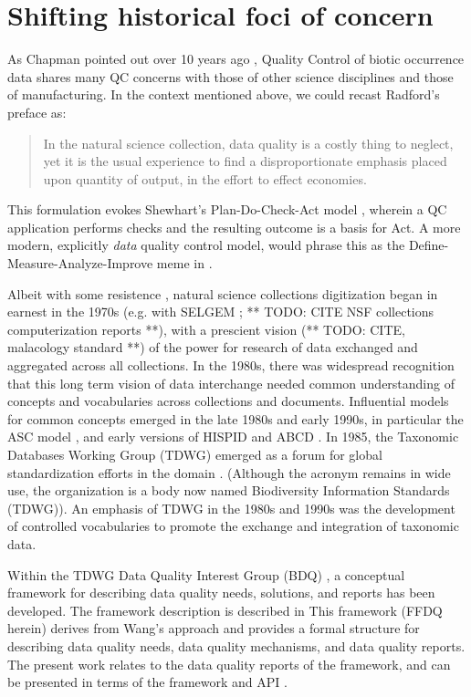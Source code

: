 \documentclass{article}
\begin{document}
  \section{Shifting historical foci of concern}
As Chapman pointed out over 10 years ago \citep{chapman_principles_2005}, Quality Control of biotic occurrence data shares many QC concerns with those of other science disciplines and those of manufacturing. 
In the context mentioned above, we could recast Radford's preface as:
\begin{quotation}
  In the natural science collection, data quality is a costly thing to neglect, yet it is the usual experience to find a disproportionate emphasis placed upon quantity of output, in the effort to effect economies.
\end{quotation}

  This formulation evokes Shewhart's Plan-Do-Check-Act model \citep{shewhart_statistical_1939}, wherein a QC application performs checks and the resulting outcome is a basis for Act. A more modern, explicitly {\em data} quality control model, would phrase this as the Define-Measure-Analyze-Improve meme in \citep{Wang1998}.  


  Albeit with some resistence \citep{ShetlerDemyth1974}, natural science collections digitization began in earnest in the 1970s (e.g. with SELGEM \citep{SELGEM1971}; ** TODO: CITE NSF collections computerization reports **), with a prescient vision (** TODO: CITE, malacology standard **) of the power for research of data exchanged and aggregated across all collections.  In the 1980s, there was widespread recognition that this long term vision of data interchange needed common understanding of concepts and vocabularies across collections and documents.  Influential models for common concepts emerged in the late 1980s and early 1990s, in particular the ASC model \citep{ASC1992}, and early versions of HISPID \citep{HISPID5} and ABCD \citep{ABCD2015}.  In 1985, the Taxonomic Databases Working Group (TDWG) emerged as a forum for global standardization efforts in the domain \citep{tdwg_tdwg_2007}. (Although the acronym remains in wide use, the organization is a body now named Biodiversity Information Standards (TDWG)).  An emphasis of TDWG in the 1980s and 1990s was the development of controlled vocabularies to promote the exchange and integration of taxonomic data.
  
Within the TDWG Data Quality Interest Group (BDQ) 
\cite{BDQ}, 
a conceptual framework for describing data quality needs, solutions, and reports has been developed. The framework description is described in  
\cite{10.1371/journal.pone.0178731}   This framework (FFDQ herein) derives from Wang's approach and provides a formal structure for describing data quality needs, data quality mechanisms, and data quality reports.  The present work relates to the data quality reports of the framework, and can be presented in terms of the framework \cite{Kurator-FFDQ} and API \cite{Kurator-FFDQAPI}.
\end{document}
